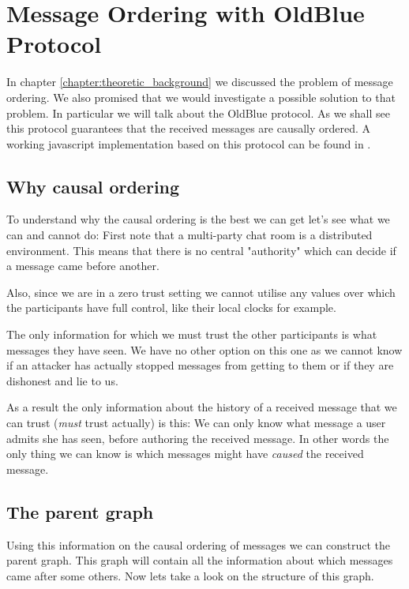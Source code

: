 \section{Message Ordering with OldBlue Protocol}
\label{section:ordering_with_oldblue}

In chapter \ref{chapter:theoretic_background} we discussed the problem of message ordering.
We also promised that we would investigate a possible solution to that problem.
In particular we will talk about the OldBlue \cite{oldBlue} protocol.
As we shall see this protocol guarantees that the received messages are causally ordered.
A working javascript implementation based on this protocol can be found in \cite{mpenc}.

\subsection{Why causal ordering}

To understand why the causal ordering is the best we can get let's see what we can and cannot do:
First note that a multi-party chat room is a distributed environment.
This means that there is no central "authority" which can decide if a message came before another.

Also, since we are in a zero trust setting we cannot utilise any values over which the participants have full control, like their local clocks for example.

The only information for which we must trust the other participants is what messages they have seen.
We have no other option on this one as we cannot know if an attacker has actually stopped messages from getting to them or if they are dishonest and lie to us.

As a result the only information about the history of a received message that we can trust (\emph{must} trust actually) is this:
We can only know what message a user admits she has seen, before authoring the received message.
In other words the only thing we can know is which messages might have \emph{caused} the received message.

\subsection{The parent graph}

Using this information on the causal ordering of messages we can construct the parent graph.
This graph will contain all the information about which messages came after some others.
Now lets take a look on the structure of this graph.

